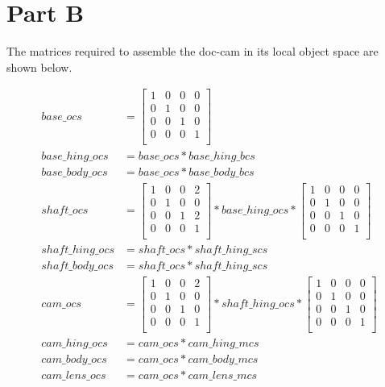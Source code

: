 \documentclass[12pt]{article}
\newcommand{\identity}{
    \begin{bmatrix}
        1 & 0 & 0 & 0 \\
        0 & 1 & 0 & 0 \\
        0 & 0 & 1 & 0 \\
        0 & 0 & 0 & 1 \\
    \end{bmatrix}
}
\newcommand{\trans}[3]{
    \begin{bmatrix}
        1 & 0 & 0 & #1 \\
        0 & 1 & 0 & #2 \\
        0 & 0 & 1 & #3 \\
        0 & 0 & 0 & 1 \\
    \end{bmatrix}
}
\newcommand{\mattext}[1]{
    The matrices required to assemble the #1 in its local object space are shown below.
}
\begin{document}
\section*{Part B}

        \mattext{doc-cam}
        $$
        \begin{aligned}
            base\_ocs         &= \identity \\
            base\_hing\_ocs   &=  base\_ocs * base\_hing\_bcs \\
            base\_body\_ocs   &=  base\_ocs * base\_body\_bcs \\
            shaft\_ocs        &= \trans{2}{0}{2} * base\_hing\_ocs * \identity \\
            shaft\_hing\_ocs  &=  shaft\_ocs * shaft\_hing\_scs \\
            shaft\_body\_ocs  &=  shaft\_ocs * shaft\_hing\_scs \\
            cam\_ocs       &= \trans{2}{0}{0} * shaft\_hing\_ocs * \identity \\
            cam\_hing\_ocs &= cam\_ocs * cam\_hing\_mcs \\
            cam\_body\_ocs &= cam\_ocs * cam\_body\_mcs \\
            cam\_lens\_ocs &= cam\_ocs * cam\_lens\_mcs \\
        \end{aligned}
        $$
\end{document}
